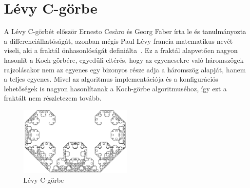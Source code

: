 \section{Lévy C-görbe}
A Lévy C-görbét először Ernesto Cesàro és Georg Faber írta le és tanulmányozta a differenciálhatóságát, azonban mégis Paul Lévy francia matematikus nevét viseli, aki a fraktál önhasonlóságát definiálta~\cite{levy-c-wiki}. Ez a fraktál alapvetően nagyon hasonlít a Koch-görbére, egyedüli eltérés, hogy az egyenesekre való háromszögek rajzolásakor nem az egyenes egy bizonyos része adja a háromszög alapját, hanem a teljes egyenes. Mivel az algoritmus implementációja és a konfigurációs lehetőségek is nagyon hasonlítanak a Koch-görbe algoritmuséhoz, így ezt a fraktált nem részletezem tovább.
\begin{figure}[!ht]
	\begin{center}
		\includegraphics[width=0.5\textwidth]{img/LevyCCurve}
		\caption[labelInTOC]{Lévy C-görbe}
	\end{center}
\end{figure}
